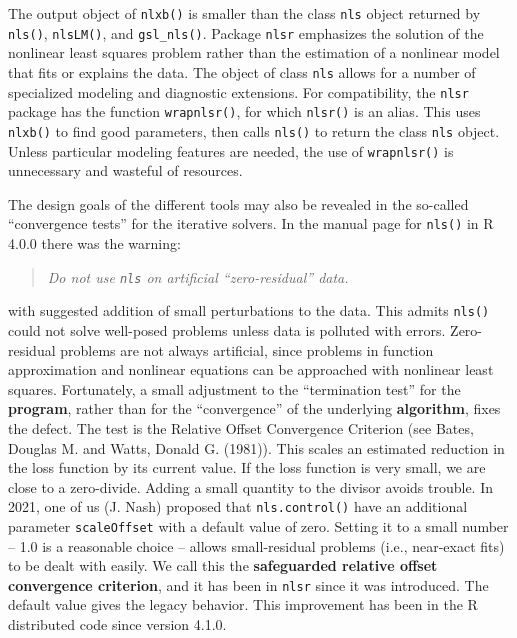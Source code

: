 The output object of \texttt{nlxb()} is smaller than the class \texttt{nls} object returned
by \texttt{nls()}, \texttt{nlsLM()}, and \texttt{gsl\_nls()}. Package \texttt{nlsr} emphasizes the solution
of the nonlinear least squares problem rather than the estimation of a nonlinear
model that fits or explains the data. The object of class \texttt{nls} allows for
a number of specialized modeling and diagnostic extensions. For compatibility,
the \texttt{nlsr} package has the function \texttt{wrapnlsr()}, for which \texttt{nlsr()} is an alias.
This uses \texttt{nlxb()} to find good parameters, then calls \texttt{nls()} to return the class
\texttt{nls} object. Unless particular modeling features are needed, the use of
\texttt{wrapnlsr()} is unnecessary and wasteful of resources.

The design goals of the different tools may also be revealed in the so-called
``convergence tests'' for the iterative solvers. In the manual page for \texttt{nls()}
in R 4.0.0 there was the warning:

\begin{quote}
\emph{Do not use \texttt{nls} on artificial ``zero-residual'' data.}
\end{quote}

with suggested addition of small perturbations to the data. This admits
\texttt{nls()} could not solve well-posed problems unless data is polluted
with errors. Zero-residual problems are not always artificial,
since problems in function approximation and nonlinear equations can be
approached with nonlinear least squares. Fortunately, a small adjustment
to the ``termination test'' for the \textbf{program}, rather than for the
``convergence'' of the underlying \textbf{algorithm}, fixes the defect. The test
is the Relative Offset Convergence
Criterion (see Bates, Douglas M. and Watts, Donald G. (1981)). This scales an estimated reduction in the loss
function by its current value. If the loss function is very small, we are close
to a zero-divide. Adding a small quantity to the divisor avoids trouble.
In 2021, one of us (J. Nash) proposed that \texttt{nls.control()} have an
additional parameter \texttt{scaleOffset} with a default value of zero. Setting it to a
small number -- 1.0 is a reasonable choice -- allows small-residual problems
(i.e., near-exact fits) to be dealt with easily. We call this the
\textbf{safeguarded relative offset convergence criterion}, and it has been in \texttt{nlsr}
since it was introduced. The default value
gives the legacy behavior. This improvement has been in the R distributed code
since version 4.1.0.

